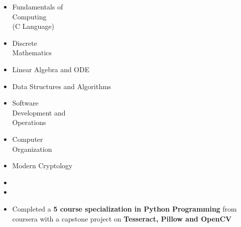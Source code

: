 \begin{multicols}{2}
\begin{itemize}
    \item Fundamentals of\\Computing\\(C Language)
   
    \item Discrete\\Mathematics
    \item Linear Algebra and ODE
     \item Data Structures and \nolinebreak Algorithms
     \columnbreak
    \item Software\\Development and\\Operations
    \item Computer\\Organization
    \item Modern Cryptology
\end{itemize}
\end{multicols}
\vspace{-0.4cm}
\vspace{-0.3cm}
\begin{itemize}
    \item {}
    \vspace{-0.3cm}
    \item {}
\end{itemize}
\vspace{-0.3cm}
\begin{itemize}
    \item Completed a \textbf{5 course specialization in Python Programming} from coursera with a capstone project on \textbf{Tesseract, Pillow and OpenCV}
\end{itemize}
